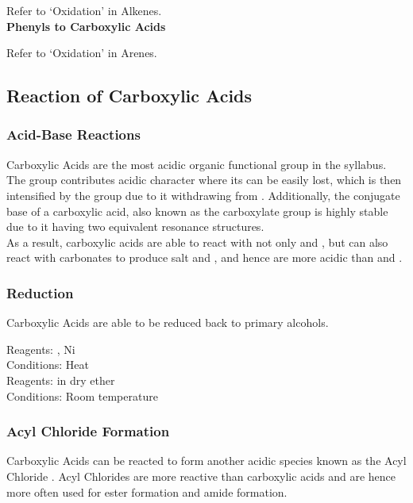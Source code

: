 \documentclass[../main]{subfiles}
\begin{document}
	Refer to `Oxidation' in Alkenes. \\ 

	\noindent \textbf{Phenyls to Carboxylic Acids}

	Refer to `Oxidation' in Arenes. \\ 

	\subsection{Reaction of Carboxylic Acids}

	\subsubsection{Acid-Base Reactions}

	Carboxylic Acids are the most acidic organic functional group in the syllabus. The  group contributes acidic character where its  can be easily lost, which is then intensified by the  group due to it withdrawing  from . Additionally, the conjugate base of a carboxylic acid, also known as the carboxylate group  is highly stable due to it having two equivalent resonance structures. \\

	As a result, carboxylic acids are able to react with not only  and , but can also react with carbonates to produce salt and , and hence are more acidic than  and . \\

	\subsubsection{Reduction}

	Carboxylic Acids are able to be reduced back to primary alcohols.

	Reagents: , Ni \\
	Conditions: Heat \\

	Reagents:  in dry ether \\
	Conditions: Room temperature \\

	\subsubsection{Acyl Chloride Formation}

	Carboxylic Acids can be reacted to form another acidic species known as the Acyl Chloride . Acyl Chlorides are more reactive than carboxylic acids and are hence more often used for ester formation and amide formation.
\end{document}
